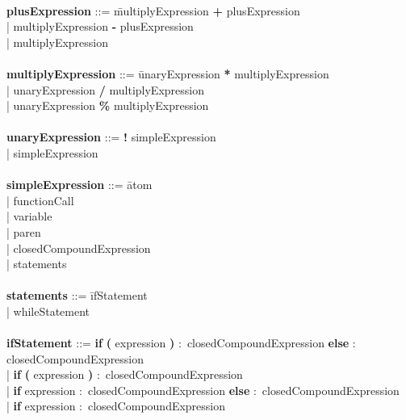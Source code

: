 \begin{tabbing}
\\ 
{\bf plusExpression}              ::= \=multiplyExpression \textbf{+} plusExpression\\
                                      \>| multiplyExpression \textbf{-} plusExpression\\
                                      \>| multiplyExpression\\
\\
{\bf multiplyExpression}          ::= \=unaryExpression \textbf{*} multiplyExpression\\
                                      \>| unaryExpression \textbf{/} multiplyExpression\\
                                      \>| unaryExpression \textbf{\%} multiplyExpression\\
\\
{\bf unaryExpression}             ::= \=\textbf{!} simpleExpression\\
                                      \>| simpleExpression\\ 
\\   
{\bf simpleExpression}            ::= \=atom\\
                                      \>| functionCall\\
                                      \>| variable\\
                                      \>| paren\\
                                      \>| closedCompoundExpression\\
                                      \>| statements\\
\\
{\bf statements}                  ::= \=ifStatement\\
                                      \>| whileStatement\\
\\
{\bf ifStatement}                 ::= \=\textbf{if} \=\textbf{(} expression \textbf{)} $\colon$ closedCompoundExpression \textbf{else} $\colon$ closedCompoundExpression\\
                                      \>| \textbf{if} \textbf{(} expression \textbf{)} $\colon$ closedCompoundExpression\\
                                      \>| \textbf{if} expression $\colon$ closedCompoundExpression \textbf{else} $\colon$ closedCompoundExpression\\
                                      \>| \textbf{if} expression $\colon$ closedCompoundExpression\\

\end{tabbing}
